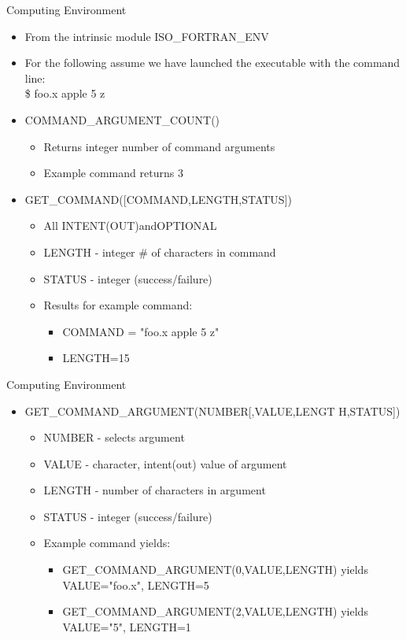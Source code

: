 \documentclass[11pt]{beamer}
\begin{document}
\begin{frame}{Computing Environment}
\begin{itemize}
  \item From the intrinsic module ISO\_FORTRAN\_ENV
  \item For the following assume we have launched the executable with the command line: \\
  \quad \$ foo.x apple 5 z
  \item COMMAND\_ARGUMENT\_COUNT()
  \begin{itemize}
  \item Returns integer number of command arguments
  \item Example command returns 3
  \end{itemize}
 
 \item GET\_COMMAND([COMMAND,LENGTH,STATUS])
  \begin{itemize}
  \item All INTENT(OUT)andOPTIONAL
  \item LENGTH - integer \# of characters in command
  \item STATUS - integer (success/failure)
  \item Results for example command:
  \begin{itemize}
  \item COMMAND = "foo.x apple 5 z"
  \item LENGTH=15
  \end{itemize}
 \end{itemize}

\end{itemize}

\end{frame}



\begin{frame}{Computing Environment}
\begin{itemize}
 \item GET\_COMMAND\_ARGUMENT(NUMBER[,VALUE,LENGT H,STATUS])
  \begin{itemize}
  \item NUMBER - selects argument
  \item VALUE - character, intent(out) value of argument
  \item LENGTH - number of characters in argument
  \item STATUS - integer (success/failure)
  \item Example command yields:
  \begin{itemize}
  \item GET\_COMMAND\_ARGUMENT(0,VALUE,LENGTH) yields \\
  \quad VALUE="foo.x", LENGTH=5
  \item GET\_COMMAND\_ARGUMENT(2,VALUE,LENGTH) yields \\
  \quad VALUE="5", LENGTH=1
  \end{itemize}
 \end{itemize}

\end{itemize}

\end{frame}
\end{document}
